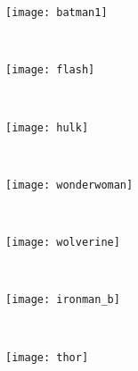 \begin{figure}[!ht]
        
    \begin{subfigure}[b]{0.1\textwidth}
		\centering
		\texttt{[image: batman1]}	
	\end{subfigure}
	~ %
    \begin{subfigure}[b]{0.1\textwidth}
		\centering
		\texttt{[image: flash]}	
	\end{subfigure}
    ~ %
    \begin{subfigure}[b]{0.1\textwidth}
		\centering
		\texttt{[image: hulk]}	
	\end{subfigure}
	~ %
    \begin{subfigure}[b]{0.1\textwidth}
		\centering
		\texttt{[image: wonderwoman]}	
	\end{subfigure}
    ~ %
    \begin{subfigure}[b]{0.1\textwidth}
		\centering
		\texttt{[image: wolverine]}	
	\end{subfigure}
    ~ %
    \begin{subfigure}[b]{0.1\textwidth}
		\centering
		\texttt{[image: ironman\_b]}	
	\end{subfigure}
    ~ %
    \begin{subfigure}[b]{0.1\textwidth}
		\centering
		\texttt{[image: thor]}	
	\end{subfigure} \\[2ex]
    

\end{figure}
